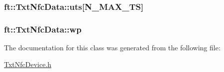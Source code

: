 \subsubsection[{\texorpdfstring{uts}{uts}}]{ ft\+::\+Txt\+Nfc\+Data\+::uts\mbox{[}{\bf N\+\_\+\+M\+A\+X\+\_\+\+TS}\mbox{]}}\hypertarget{classft_1_1_txt_nfc_data_a7671b20d7d53b5be84267e61abd7ad98}{}\label{classft_1_1_txt_nfc_data_a7671b20d7d53b5be84267e61abd7ad98}
\subsubsection[{\texorpdfstring{wp}{wp}}]{ ft\+::\+Txt\+Nfc\+Data\+::wp}\hypertarget{classft_1_1_txt_nfc_data_aec7e3a438a5ff8f113f5c7819d038c1f}{}\label{classft_1_1_txt_nfc_data_aec7e3a438a5ff8f113f5c7819d038c1f}


The documentation for this class was generated from the following file\+:\begin{DoxyCompactItemize}
\item 
\hyperlink{_txt_nfc_device_8h}{Txt\+Nfc\+Device.\+h}\end{DoxyCompactItemize}
